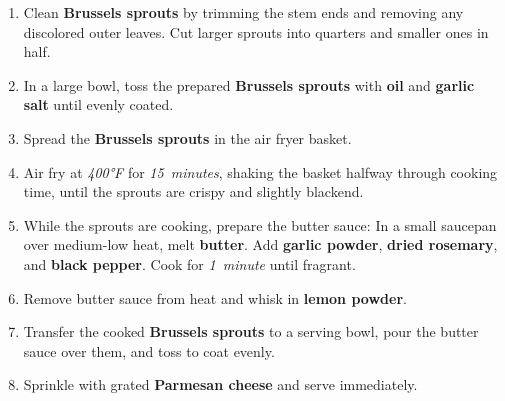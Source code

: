 \documentclass[11pt,letterpaper]{article}
\begin{document}
\begin{enumerate}
    \item Clean \textbf{Brussels sprouts} by trimming the stem ends and removing any discolored outer leaves. Cut larger sprouts into quarters and smaller ones in half.
    
    \item In a large bowl, toss the prepared \textbf{Brussels sprouts} with \textbf{oil} and \textbf{garlic salt} until evenly coated.
    
    \item Spread the \textbf{Brussels sprouts} in the air fryer basket.
    
    \item Air fry at \textit{400°F} for \textit{15~minutes}, shaking the basket halfway through cooking time, until the sprouts are crispy and slightly blackend.
    
    \item While the sprouts are cooking, prepare the butter sauce: In a small saucepan over medium-low heat, melt \textbf{butter}. Add \textbf{garlic powder}, \textbf{dried rosemary}, and \textbf{black pepper}. Cook for \textit{1~minute} until fragrant.
    
    \item Remove butter sauce from heat and whisk in \textbf{lemon powder}.
    
    \item Transfer the cooked \textbf{Brussels sprouts} to a serving bowl, pour the butter sauce over them, and toss to coat evenly.
    
    \item Sprinkle with grated \textbf{Parmesan cheese} and serve immediately.
\end{enumerate}

\newpage
\end{document}
